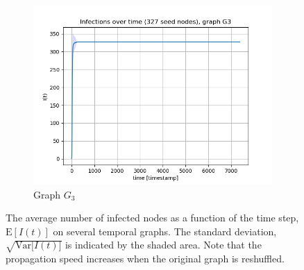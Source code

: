 \documentclass[letterpaper]{article}
\begin{document}
\begin{figure}
\begin{subfigure}[b]{0.32\textwidth}
        \includegraphics[width=\textwidth]{img/infections_G3.png}
        \caption{Graph \(G_3\)}
	    \label{fig:infections_over_time_G3}
    \end{subfigure}
    \caption{\small{The average number of infected nodes as a function of the time step, $\mathrm{E}[I(t)]$ on several temporal graphs. The standard deviation, $\sqrt{\mathrm{Var}{[I(t)}]}$ is indicated by the shaded area. Note that the propagation speed increases when the original graph is reshuffled.}}
    \label{fig:infections_over_time}
	
	\bigskip
	

\end{figure}
\end{document}
